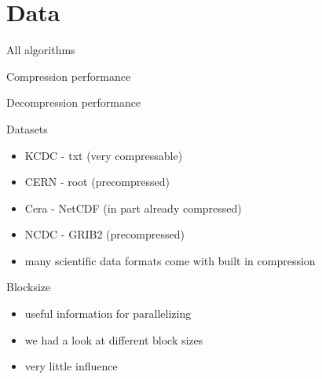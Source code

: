 \documentclass[10pt, compress]{beamer}
\begin{document}
\section{Data}
\begin{frame}{All algorithms}
    \begin{figure}[h]
        \begin{center}
            \scalebox{0.5}{}
        \end{center}
    \end{figure}
\end{frame}

\begin{frame}{Compression performance}
    \begin{figure}[h]
        \begin{center}
            \scalebox{0.5}{}
        \end{center}
    \end{figure}
\end{frame}

\begin{frame}{Decompression performance}
    \begin{figure}[h]
        \begin{center}
            \scalebox{0.5}{}
        \end{center}
    \end{figure}
\end{frame}

\begin{frame}{Datasets}
    \begin{itemize}
        \item KCDC - txt (very compressable)
        \item CERN - root (precompressed)
        \item Cera - NetCDF (in part already compressed)
        \item NCDC - GRIB2 (precompressed)
        \item \textrightarrow many scientific data formats come with built in compression
    \end{itemize}
\end{frame}

\begin{frame}{Blocksize}
    \begin{itemize}
        \item useful information for parallelizing
        \item we had a look at different block sizes 
        \item very little influence
    \end{itemize}
    \vspace{-0.9em}
    \begin{figure}[h]
        \begin{center}
            \scalebox{0.42}{}
        \end{center}
    \end{figure}
\end{frame}
\end{document}

